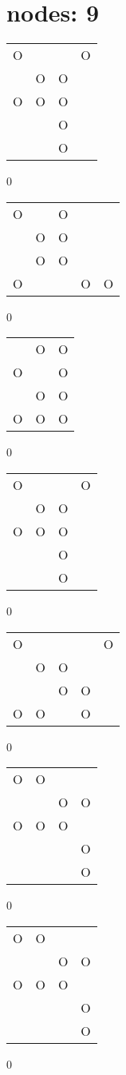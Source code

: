 \section{nodes: 9}
\begin{tabular}{|m{0.2cm}m{0.2cm}m{0.2cm}m{0.2cm}|}\hline
O& & &O\\
 &O&O& \\
O&O&O& \\
 & &O& \\
 & &O& \\
\hline\end{tabular}0
\begin{tabular}{|m{0.2cm}m{0.2cm}m{0.2cm}m{0.2cm}m{0.2cm}|}\hline
O& &O& & \\
 &O&O& & \\
 &O&O& & \\
O& & &O&O\\
\hline\end{tabular}0
\begin{tabular}{|m{0.2cm}m{0.2cm}m{0.2cm}|}\hline
 &O&O\\
O& &O\\
 &O&O\\
O&O&O\\
\hline\end{tabular}0
\begin{tabular}{|m{0.2cm}m{0.2cm}m{0.2cm}m{0.2cm}|}\hline
O& & &O\\
 &O&O& \\
O&O&O& \\
 & &O& \\
 & &O& \\
\hline\end{tabular}0
\begin{tabular}{|m{0.2cm}m{0.2cm}m{0.2cm}m{0.2cm}m{0.2cm}|}\hline
O& & & &O\\
 &O&O& & \\
 & &O&O& \\
O&O& &O& \\
\hline\end{tabular}0
\begin{tabular}{|m{0.2cm}m{0.2cm}m{0.2cm}m{0.2cm}|}\hline
O&O& & \\
 & &O&O\\
O&O&O& \\
 & & &O\\
 & & &O\\
\hline\end{tabular}0
\begin{tabular}{|m{0.2cm}m{0.2cm}m{0.2cm}m{0.2cm}|}\hline
O&O& & \\
 & &O&O\\
O&O&O& \\
 & & &O\\
 & & &O\\
\hline\end{tabular}0
